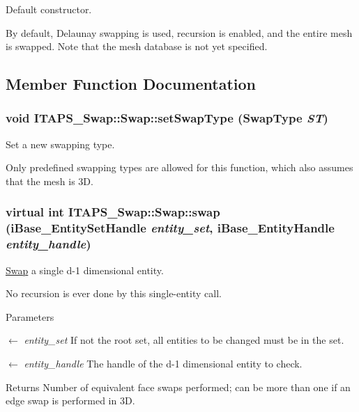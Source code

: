 Default constructor. 

By default, Delaunay swapping is used, recursion is enabled, and the entire mesh is swapped. Note that the mesh database is not yet specified. 

\subsection{Member Function Documentation}
\hypertarget{class_i_t_a_p_s___swap_1_1_swap_a1cfc31d486bf82d7481ce87caec66853}{
\subsubsection[{setSwapType}]{\setlength{\rightskip}{0pt plus 5cm}void ITAPS\_\-Swap::Swap::setSwapType (SwapType {\em ST})}}
\label{class_i_t_a_p_s___swap_1_1_swap_a1cfc31d486bf82d7481ce87caec66853}


Set a new swapping type. 

Only predefined swapping types are allowed for this function, which also assumes that the mesh is 3D. \hypertarget{class_i_t_a_p_s___swap_1_1_swap_adfb444f7ade3254ba8fa9ced2ec15e65}{
\subsubsection[{swap}]{\setlength{\rightskip}{0pt plus 5cm}virtual int ITAPS\_\-Swap::Swap::swap (iBase\_\-EntitySetHandle {\em entity\_\-set}, \/  iBase\_\-EntityHandle {\em entity\_\-handle})}}
\label{class_i_t_a_p_s___swap_1_1_swap_adfb444f7ade3254ba8fa9ced2ec15e65}


\hyperlink{class_i_t_a_p_s___swap_1_1_swap}{Swap} a single d-\/1 dimensional entity. 

No recursion is ever done by this single-\/entity call.


\begin{DoxyParams}{Parameters}
\item[\mbox{$\leftarrow$} {\em entity\_\-set}]If not the root set, all entities to be changed must be in the set.\item[\mbox{$\leftarrow$} {\em entity\_\-handle}]The handle of the d-\/1 dimensional entity to check.\end{DoxyParams}
\begin{DoxyReturn}{Returns}
Number of equivalent face swaps performed; can be more than one if an edge swap is performed in 3D. 
\end{DoxyReturn}


